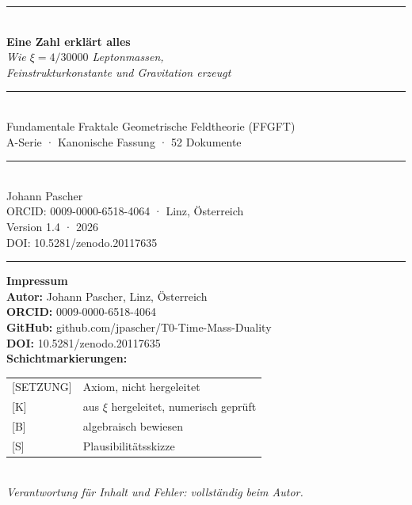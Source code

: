 \documentclass[11pt,twoside,openright]{book}
\begin{document}
\begin{titlepage}
\centering
\vspace*{1.6cm}
{\color{t0blue}\rule{\textwidth}{2pt}}\\[1.2cm]
{\Huge\bfseries\color{t0blue} Eine Zahl erklärt alles}\\[0.7cm]
{\large\color{t0orange}\itshape
  Wie $\xi = 4/30000$ Leptonmassen,\\[0.2em]
  Feinstrukturkonstante und Gravitation erzeugt
}\\[1.1cm]
{\color{t0blue}\rule{0.55\textwidth}{0.8pt}}\\[1.0cm]
{\normalsize\color{black}
  Fundamentale Fraktale Geometrische Feldtheorie (FFGFT)\\[0.2em]
  A-Serie · Kanonische Fassung · 52 Dokumente
}\\[1.2cm]
{\color{t0blue}\rule{0.55\textwidth}{0.8pt}}\\[1.0cm]
{\large Johann Pascher}\\[0.3cm]
{\small ORCID: 0009-0000-6518-4064 · Linz, Österreich}\\[0.2cm]
{\small Version 1.4 · 2026}\\[0.4cm]
{\small DOI: 10.5281/zenodo.20117635}\\[1.2cm]
{\color{t0blue}\rule{\textwidth}{2pt}}
\end{titlepage}

\thispagestyle{empty}
\vspace*{\fill}
{\small
\noindent\textbf{Impressum}\\[0.4em]
\textbf{Autor:} Johann Pascher, Linz, Österreich\\
\textbf{ORCID:} 0009-0000-6518-4064\\
\textbf{GitHub:} github.com/jpascher/T0-Time-Mass-Duality\\
\textbf{DOI:} 10.5281/zenodo.20117635\\[0.7em]
\textbf{Schichtmarkierungen:}\\[0.3em]
\begin{tabular}{@{}ll@{}}
{[SETZUNG]} & Axiom, nicht hergeleitet \\[2pt]
{[K]} & aus $\xi$ hergeleitet, numerisch geprüft \\[2pt]
{[B]} & algebraisch bewiesen \\[2pt]
{[S]} & Plausibilitätsskizze \\
\end{tabular}\\[0.7em]
\textit{Verantwortung für Inhalt und Fehler: vollständig beim Autor.}
}
\clearpage
\end{document}
